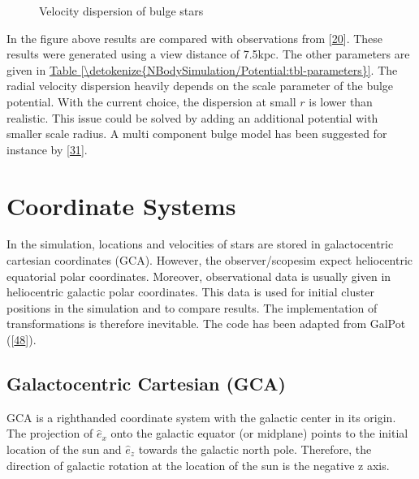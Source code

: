 \documentclass[letterpaper,10pt,english]{sphinxmanual}
\begin{document}
\begin{figure}[htbp]
\centering
\capstart

\noindent{}
\caption{Velocity dispersion of bulge stars}\label{\detokenize{NBodySimulation/Initialization:id46}}\end{figure}

\sphinxAtStartPar
In the figure above results are compared with observations from {[}\hyperlink{cite.NBodySimulation/Appendix:id21}{20}{]}. These results were generated using a view distance of 7.5kpc.
The other parameters are given in \hyperref[\detokenize{NBodySimulation/Potential:tbl-parameters}]{Table \ref{\detokenize{NBodySimulation/Potential:tbl-parameters}}}. The radial velocity dispersion heavily depends on the scale parameter of the bulge potential.
With the current choice, the dispersion at small \(r\) is lower than realistic. This issue could be solved by adding an additional potential with smaller scale radius.
A multi component bulge model has been suggested for instance by {[}\hyperlink{cite.NBodySimulation/Appendix:id22}{31}{]}.


\chapter{Coordinate Systems}
\label{\detokenize{NBodySimulation/CoordinateSystems:coordinate-systems}}\label{\detokenize{NBodySimulation/CoordinateSystems::doc}}
\sphinxAtStartPar
In the simulation, locations and velocities of stars are stored in galactocentric cartesian coordinates (GCA).
However, the observer/scopesim expect heliocentric equatorial polar coordinates.
Moreover, observational data is usually given in heliocentric galactic polar coordinates.
This data is used for initial cluster positions in the simulation and to compare results.
The implementation of transformations is therefore inevitable. The code has been adapted from GalPot ({[}\hyperlink{cite.NBodySimulation/Appendix:id23}{48}{]}).


\section{Galactocentric Cartesian (GCA)}
\label{\detokenize{NBodySimulation/CoordinateSystems:galactocentric-cartesian-gca}}
\sphinxAtStartPar
GCA is a right\sphinxhyphen{}handed coordinate system with the galactic center in its origin.
The projection of \(\hat{e}_x\) onto the galactic equator (or midplane) points to the initial location of the sun and
\(\hat{e}_z\) towards the galactic north pole. Therefore, the direction of galactic rotation at the location of the sun is the negative z axis.
\end{document}
